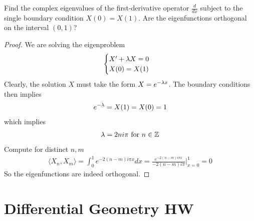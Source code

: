 \documentclass{report}
\begin{document}
\begin{question}{}{}
Find the complex eigenvalues of the first-derivative operator $\frac{d}{dx}$ subject to the single boundary condition $X(0)=X(1)$. Are the eigenfunctions orthogonal on the interval $(0,1)$? 
\end{question}
\begin{proof}
We are solving the eigenproblem 
\begin{align*}
\begin{cases}
  X'+ \lambda X=0 \\
  X(0)=X(1)
\end{cases}
\end{align*}
Clearly, the solution $X$ must take the form  $X=e^{-\lambda x}$. The boundary conditions then implies 
\begin{align*}
e^{-\lambda }=X(1)=X(0)=1
\end{align*}
which implies 
\begin{align*}
\lambda = 2n i \pi \text{ for }n\in\mathbb{Z}
\end{align*}
Compute for distinct $n,m$ 
\begin{align*}
\langle X_n,X_m\rangle = \int_0^1 e^{- 2(n-m) i \pi  x}dx= \frac{e^{-2(n-m)i \pi  x}}{-2(n-m)i \pi }\Big|_{x=0}^1= 0
\end{align*}
So the eigenfunctions are indeed orthogonal. 
\end{proof}
\chapter{Differential Geometry HW} 
\end{document}
